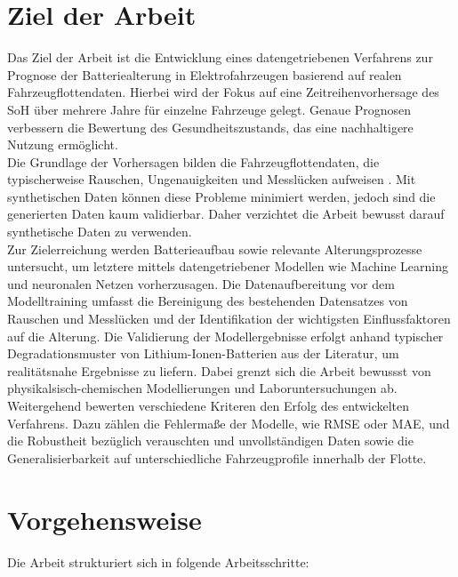 \pagebreak
\section{Ziel der Arbeit}

Das Ziel der Arbeit ist die Entwicklung eines datengetriebenen Verfahrens zur Prognose der Batteriealterung in Elektrofahrzeugen basierend auf realen Fahrzeugflottendaten. Hierbei wird der Fokus auf eine Zeitreihenvorhersage des SoH über mehrere Jahre für einzelne Fahrzeuge gelegt. Genaue Prognosen verbessern die Bewertung des Gesundheitszustands, das eine nachhaltigere Nutzung ermöglicht.
\\
Die Grundlage der Vorhersagen bilden die Fahrzeugflottendaten, die typischerweise Rauschen, Ungenauigkeiten und Messlücken aufweisen \cite{idEigeneFlottenDaten}. Mit synthetischen Daten können diese Probleme minimiert werden, jedoch sind die generierten Daten kaum validierbar. Daher verzichtet die Arbeit bewusst darauf synthetische Daten zu verwenden.
\\
Zur Zielerreichung werden Batterieaufbau sowie relevante Alterungsprozesse untersucht, um letztere mittels datengetriebener Modellen wie Machine Learning und neuronalen Netzen vorherzusagen. Die Datenaufbereitung vor dem Modelltraining umfasst die Bereinigung des bestehenden Datensatzes von Rauschen und Messlücken und der Identifikation der wichtigsten Einflussfaktoren auf die Alterung. Die Validierung der Modellergebnisse erfolgt anhand typischer Degradationsmuster von Lithium-Ionen-Batterien aus der Literatur, um realitätsnahe Ergebnisse zu liefern. Dabei grenzt sich die Arbeit bewussst von physikalsisch-chemischen Modellierungen und Laboruntersuchungen ab.
\\
Weitergehend bewerten verschiedene Kriteren den Erfolg des entwickelten Verfahrens. Dazu zählen die Fehlermaße der Modelle, wie RMSE oder MAE, und die Robustheit bezüglich verauschten und unvollständigen Daten sowie die Generalisierbarkeit auf unterschiedliche Fahrzeugprofile innerhalb der Flotte.
\pagebreak
\section{Vorgehensweise}

Die Arbeit strukturiert sich in folgende Arbeitsschritte:
 
